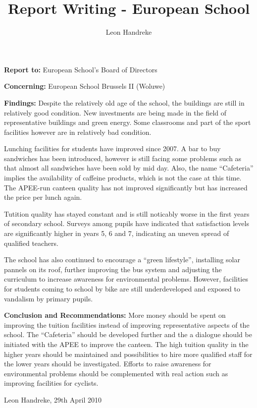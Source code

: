 \documentclass[10pt]{article}
\title{Report Writing - European School}
\author{Leon Handreke}
\date{}                                           %
\begin{document}
\onehalfspacing

\maketitle
{}\selectfont

\textbf{Report to:} European School's Board of Directors

\textbf{Concerning:} European School Brussels II (Woluwe)

\textbf{Findings:} Despite the relatively old age of the school, the buildings are still in relatively good condition. New investments are being made in the field of representative buildings and green energy. Some classrooms and part of the sport facilities however are in relatively bad condition.

Lunching facilities for students have improved since 2007. A bar to buy sandwiches has been introduced, however is still facing some problems such as that almost all sandwiches have been sold by mid day. Also, the name ``Cafeteria'' implies the availability of caffeine products, which is not the case at this time. The APEE-run canteen quality has not improved significantly but has increased the price per lunch again.

Tutition quality has stayed constant and is still noticably worse in the first years of secondary school. Surveys among pupils have indicated that satisfaction levels are significantly higher in years 5, 6 and 7, indicating an uneven spread of qualified teachers.

The school has also continued to encourage a ``green lifestyle'', installing solar pannels on its roof, further improving the bus system and adjusting the curriculum to increase awareness for environmental problems. However, facilities for students coming to school by bike are still underdeveloped and exposed to vandalism by primary pupils.

\textbf{Conclusion and Recommendations:} More money should be spent on improving the tuition facilities instead of improving representative aspects of the school. The ``Cafeteria'' should be developed further and the a dialogue should be initiated with the APEE to improve the canteen. The high tuition quality in the higher years should be maintained and possibilities to hire more qualified staff for the lower years should be investigated. Efforts to raise awareness for environmental problems should be complemented with real action such as improving facilities for cyclists.


Leon Handreke, 29th April 2010
\end{document}
